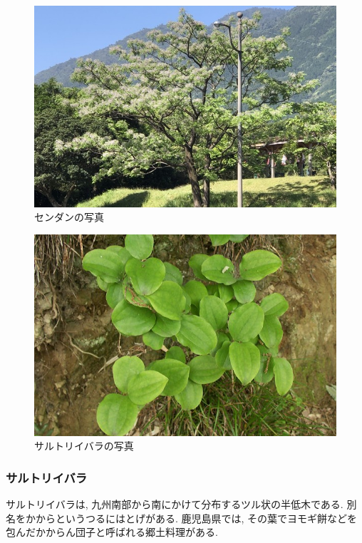 \documentclass[10pt,titlepage,a5paper]{ltjsbook}
\begin{document}
    \begin{minipage}{0.38\columnwidth}
      \begin{figure}[H]
          \centering
          \includegraphics[width=\columnwidth]{sendan.jpg}
          \caption{センダンの写真}
          \label{fig:sendan_photo}
      \end{figure}
    \end{minipage}
    \vfill
    \begin{minipage}{0.38\columnwidth}
      \begin{figure}[H]
          \centering
          \includegraphics[width=\columnwidth]{sarutoriibara.jpg}
          \caption{サルトリイバラの写真}
          \label{fig:sarutoriibara_photo}
      \end{figure}
    \end{minipage}
    \hfill
    \begin{minipage}{0.58\columnwidth}
      \subsubsection*{サルトリイバラ}
        サルトリイバラは, 九州南部から南にかけて分布するツル状の半低木である. 別名をかからというつるにはとげがある. 鹿児島県では, その葉でヨモギ餅などを包んだかからん団子と呼ばれる郷土料理がある.\footnotemark[9] 
    \end{minipage}
    \vfill
    \newpage
\end{document}
